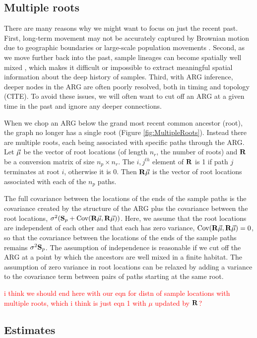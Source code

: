 \subsection{Multiple roots}

There are many reasons why we might want to focus on just the recent past. First, long-term movement may not be accurately captured by Brownian motion due to geographic boundaries or large-scale population movements \citep{Ianni2022}. Second, as we move further back into the past, sample lineages can become spatially well mixed \citep{Wakeley1999}, which makes it difficult or impossible to extract meaningful spatial information about the deep history of samples. Third, with ARG inference, deeper nodes in the ARG are often poorly resolved, both in timing and topology (CITE). To avoid these issues, we will often want to cut off an ARG at a given time in the past and ignore any deeper connections.

When we chop an ARG below the grand most recent common ancestor (root), the graph no longer has a single root (Figure \ref{fig:MultipleRoots}). Instead there are multiple roots, each being associated with specific paths through the ARG. Let $\vec{\mu}$ be the vector of root locations (of length $n_r$, the number of roots) and $\mathbf{R}$ be a conversion matrix of size $n_p \times n_r$. The $i,j^{th}$ element of $\mathbf{R}$ is 1 if path $j$ terminates at root $i$, otherwise it is 0. Then $\mathbf{R} \vec{\mu}$ is the vector of root locations associated with each of the $n_p$ paths.

The full covariance between the locations of the ends of the sample paths is the covariance created by the structure of the ARG plus the covariance between the root locations, $\sigma^2 ( \mathbf{S}_p + \text{Cov}(\mathbf{R}\vec{\mu}, \mathbf{R}\vec{\mu}))$. Here, we assume that the root locations are independent of each other and that each has zero variance, $\text{Cov}(\mathbf{R}\vec{\mu}, \mathbf{R}\vec{\mu})=0$, so that the covariance between the locations of the ends of the sample paths remains $\sigma^2 \mathbf{S}_p$. The assumption of independence is reasonable if we cut off the ARG at a point by which the ancestors are well mixed in a finite habitat. The assumption of zero variance in root locations can be relaxed by adding a variance to the covariance term between pairs of paths starting at the same root.

\textcolor{red}{i think we should end here with our eqn for distn of sample locations with multiple roots, which i think is just eqn 1 with $\mu$ updated by $\mathbf{R}$?}

\subsection{Estimates}

